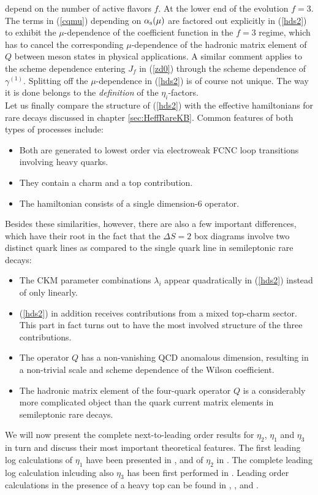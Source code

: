 depend on the number of active flavors $f$. At the lower end of the
evolution $f=3$. The terms in (\ref{cqmu}) depending on
$\alpha_{\rm s}(\mu)$ are factored out explicitly in (\ref{hds2}) to
exhibit the $\mu$-dependence of the coefficient function in the
$f=3$ regime, which has to cancel the corresponding $\mu$-dependence
of the hadronic matrix element of $Q$ between meson states in
physical applications. A similar comment applies to the scheme
dependence entering $J_f$ in (\ref{zd0}) through the scheme
dependence of $\gamma^{(1)}$. Splitting off the $\mu$-dependence in
(\ref{hds2}) is of course not unique. The way it is done belongs to the
{\em definition} of the $\eta_i$-factors.
\\
Let us finally compare the structure of (\ref{hds2}) with the
effective hamiltonians for rare decays discussed in chapter
\ref{sec:HeffRareKB}. Common features of both types of processes
include:
\begin{itemize}
\item
Both are generated to lowest order via electroweak FCNC loop
transitions involving heavy quarks.
\item
They contain a charm and a top contribution.
\item
The hamiltonian consists of a single dimension-6 operator.
\end{itemize}
Besides these similarities, however, there are also a few important
differences, which have their root in the fact that the $\Delta S=2$
box diagrams involve two distinct quark lines as compared to the single
quark line in semileptonic rare decays:
\begin{itemize}
\item
The CKM parameter combinations $\lambda_i$ appear quadratically in
(\ref{hds2}) instead of only linearly.
\item
(\ref{hds2}) in addition receives contributions from a mixed
top-charm sector. This part in fact turns out to have the most
involved structure of the three contributions.
\item
The operator $Q$ has a non-vanishing QCD anomalous dimension, resulting
in a non-trivial scale and scheme dependence of the Wilson
coefficient.
\item
The hadronic matrix element of the four-quark operator $Q$ is
a considerably more complicated object than the quark current
matrix elements in semileptonic rare decays.
\end{itemize}
We will now present the complete next-to-leading order results for
$\eta_2$, $\eta_1$ and $\eta_3$ in turn and discuss their most
important theoretical features. The first leading log calculations of
$\eta_1$ have been presented in \cite{vainshteinetal:76},
\cite{novikovetal:77} and of $\eta_2$ in \cite{vysotskij:80}. The
complete leading log calculation inlcuding also $\eta_3$ has been first
performed in \cite{gilmanwise:83}.  Leading order calculations in the
presence of a heavy top can be found in \cite{kaufmanetal:89},
\cite{flynn:90}, \cite{dattaetal:90} and \cite{dattaetal:95}.

